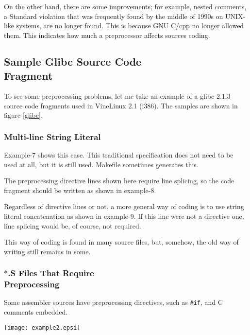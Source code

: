 \documentclass[twocolumn]{article}
\begin{document}
On the other hand, there are some improvements; for example, nested comments, a Standard violation that was frequently found by the middle of 1990s on UNIX-like systems, are no longer found.  This is because GNU C/cpp no longer allowed them.  This indicates how much a preprocessor affects sources coding.

\subsection{Sample Glibc Source Code\\
 Fragment}

To see some preprocessing problems, let me take an example of a glibc 2.1.3 source code fragments used in VineLinux 2.1 (i386).  The samples are shown in figure \ref{glibc}.

\subsubsection{Multi-line String Literal}

Example-7 shows this case.  This traditional specification does not need to be used at all, but it is still used.  Makefile sometimes generates this.

The preprocessing directive lines shown here require line splicing, so the code fragment should be written as shown in example-8.

Regardless of directive lines or not, a more general way of coding is to use string literal concatenation as shown in example-9.  If this line were not a directive one, line splicing would be, of course, not required.

This way of coding is found in many source files, but, somehow, the old way of writing still remains in some.

\subsubsection{$*$.S Files That Require \\
Preprocessing}

Some assembler sources have preprocessing directives, such as \verb|#if|, and C comments embedded.

\begin{figure*}
\begin{center}
\texttt{[image: example2.epsi]}
\end{center}
\caption{Code Fragments from glibc}
\label{glibc}
\end{figure*}%
\end{document}
